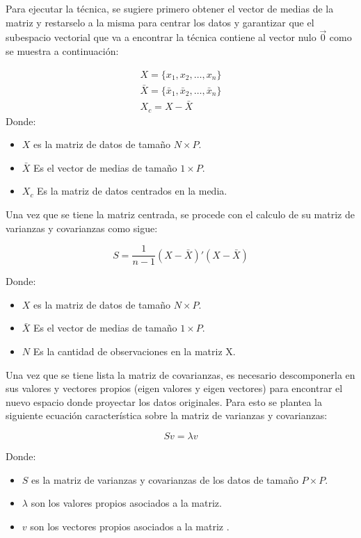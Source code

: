 \documentclass[11pt, letterpaper]{article}
\begin{document}
	Para ejecutar la técnica, se sugiere primero obtener el vector de medias de la matriz y restarselo a la misma para centrar los datos y garantizar que el subespacio vectorial que va a encontrar la técnica contiene al vector nulo $\vec{0}$ como se muestra a continuación:
	
	$$
	 \begin{matrix}
	 	X = \{x_1,x_2,\dots,x_n\} \\
	 	 \bar{X} = \{\bar{x}_1,\bar{x}_2,\dots,\bar{x}_n\} \\
	 	X_c = X-\bar{X}
	 \end{matrix}
	$$
	Donde: 
	\begin{itemize}
		\item $X$ es la matriz de datos de tamaño $N\times P$.
		\item $\bar{X}$ Es el vector de medias de tamaño $1\times P$.
		\item $X_c$ Es la matriz de datos centrados en la media.
	\end{itemize}
	
	Una vez que se tiene la matriz centrada, se procede con el calculo de su matriz de varianzas y covarianzas como sigue:
	
	$$S = \frac{1}{n-1} (X-\bar{X})' (X-\bar{X})$$
	
	Donde: 
	\begin{itemize}
		\item $X$ es la matriz de datos de tamaño $N\times P$.
		\item $\bar{X}$ Es el vector de medias de tamaño $1\times P$.
		\item $N$ Es la cantidad de observaciones en la matriz X.
	\end{itemize}

\newpage

Una vez que se tiene lista la matriz de covarianzas, es necesario descomponerla en sus valores y vectores propios (eigen valores y eigen vectores) para encontrar el nuevo espacio donde proyectar los datos originales. Para esto se plantea la siguiente ecuación característica sobre la matriz de varianzas y covarianzas:

$$Sv = \lambda v$$

	Donde: 
	\begin{itemize}
		\item $S$ es la matriz de varianzas y covarianzas de los datos de tamaño $P\times P$.
		\item $\lambda$ son los valores propios asociados a la matriz.
		\item $v$ son los vectores propios asociados a la matriz .
	\end{itemize}
\end{document}

